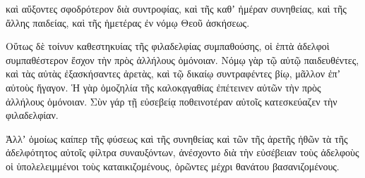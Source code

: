 {καὶ αὔξοντες σφοδρότερον διὰ συντροφίας, καὶ τῆς καθʼ ἠμέραν συνηθείας, καὶ τῆς ἄλλης παιδείας, καὶ τῆς ἡμετέρας ἐν νόμῳ Θεοῦ ἀσκήσεως.
\par }{\PP {}Οὕτως δὲ τοίνυν καθεστηκυίας τῆς φιλαδελφίας συμπαθούσης, οἱ ἑπτὰ ἀδελφοὶ συμπαθέστερον ἔσχον τὴν πρὸς ἀλλήλους ὁμόνοιαν.
Νόμῳ γὰρ τῷ αὐτῷ παιδευθέντες, καὶ τὰς αὐτὰς ἐξασκήσαντες ἀρετὰς, καὶ τῷ δικαίῳ συντραφέντες βίῳ, μᾶλλον ἐπʼ αὐτοὺς ἥγαγον.
Ἡ γὰρ ὁμοζηλία τῆς καλοκᾳγαθίας ἐπέτεινεν αὐτῶν τὴν πρὸς ἀλλήλους ὁμόνοιαν.
Σὺν γάρ τῇ εὐσεβείᾳ ποθεινοτέραν αὐτοῖς κατεσκεύαζεν τὴν φιλαδελφίαν.
\par }{\PP {}Ἀλλʼ ὁμοίως καίπερ τῆς φύσεως καὶ τῆς συνηθείας καὶ τῶν τῆς ἀρετῆς ἠθῶν τὰ τῆς ἀδελφότητος αὐτοῖς φίλτρα συναυξόντων, ἀνέσχοντο διὰ τὴν εὐσέβειαν τοὺς ἀδελφοὺς οἱ ὑπολελειμμένοι τοὺς καταικιζομένους, ὁρῶντες μέχρι θανάτου βασανιζομένους.

}
